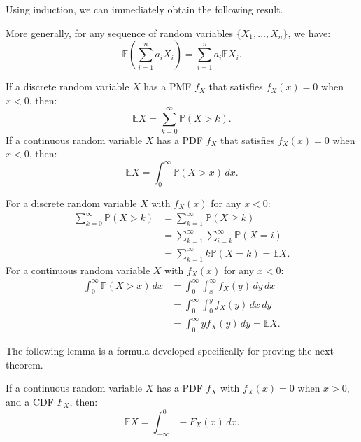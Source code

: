\documentclass{huhtakm-template-book-v2}
\newcommand{\prob}{\mathbb{P}}
\newcommand{\expect}{\mathbb{E}}
\begin{document}
    Using induction, we can immediately obtain the following result.
    \begin{lem} 
        More generally, for any sequence of random variables $\{X_{1},\dots,X_{n}\}$, we have:
        \begin{equation*}
            \expect\left(\sum_{i = 1}^{n}a_{i}X_{i}\right) = \sum_{i = 1}^{n}a_{i}\expect{X_{i}}.
        \end{equation*}
    \end{lem}
    \newpage

    \begin{thm}
        \label{Chapter 6 (Theorem) Tail Sum Formula}
        If a discrete random variable $X$ has a PMF $f_{X}$ that satisfies $f_{X}(x) = 0$ when $x < 0$, then:
        \begin{equation*}
            \expect{X} = \sum_{k = 0}^{\infty}\prob(X > k).
        \end{equation*}
        If a continuous random variable $X$ has a PDF $f_{X}$ that satisfies $f_{X}(x) = 0$ when $x < 0$, then:
        \begin{equation*}
            \expect{X} = \int_{0}^{\infty}\prob(X > x)\,dx.
        \end{equation*}
    \end{thm}
    \begin{proofing}
        For a discrete random variable $X$ with $f_{X}(x)$ for any $x < 0$:
        \begin{align*}
            \sum_{k = 0}^{\infty}\prob(X > k) &= \sum_{k = 1}^{\infty}\prob(X \geq k)\\
            &= \sum_{k = 1}^{\infty}\sum_{i = k}^{\infty}\prob(X = i)\\
            &= \sum_{k = 1}^{\infty}k\prob(X = k) = \expect{X}.
        \end{align*}
        For a continuous random variable $X$ with $f_{X}(x)$ for any $x < 0$:
        \begin{align*}
            \int_{0}^{\infty}\prob(X > x)\,dx &= \int_{0}^{\infty}\int_{x}^{\infty}f_{X}(y)\,dy\,dx\\
            &= \int_{0}^{\infty}\int_{0}^{y}f_{X}(y)\,dx\,dy\\
            &= \int_{0}^{\infty}yf_{X}(y)\,dy = \expect{X}.
        \end{align*}
    \end{proofing}
    The following lemma is a formula developed specifically for proving the next theorem.
    \begin{lem}
        \label{Chapter 6 (Lemma) Expectation as Integral of CDF}
        If a continuous random variable $X$ has a PDF $f_{X}$ with $f_{X}(x) = 0$ when $x > 0$, and a CDF $F_{X}$, then:
        \begin{equation*}
            \expect{X} = \int_{-\infty}^{0}-F_{X}(x)\,dx.
        \end{equation*}
    \end{lem}
\end{document}
